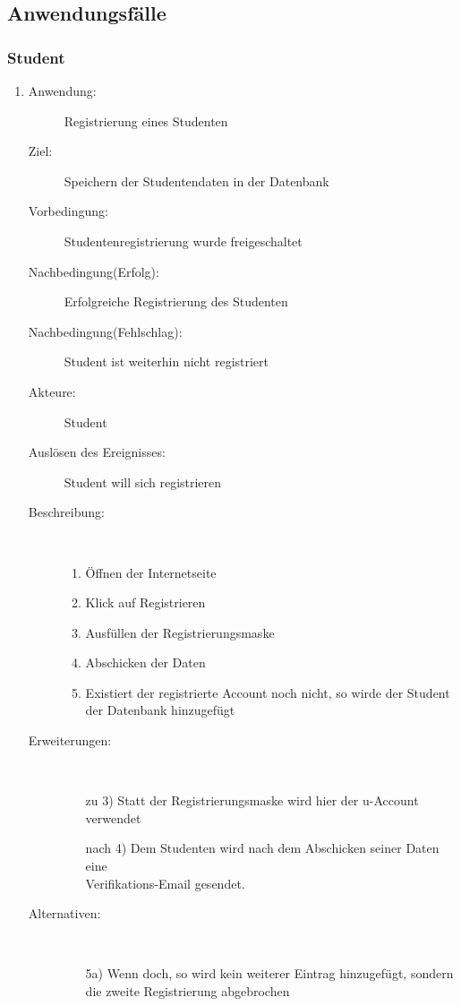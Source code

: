 \documentclass[parskip=full]{scrartcl}
\newcommand{\swtLabel}[1]{\textbf{\textbackslash #1\arabic*0\textbackslash}}
\begin{document}
\subsection{Anwendungsfälle}

\subsubsection{Student}

\begin{enumerate}[label=\swtLabel{S}]
	\item
    \begin{description}
  	\item[Anwendung:] Registrierung eines Studenten
  	\item[Ziel:] Speichern der Studentendaten in der Datenbank
  	\item[Vorbedingung:] Studentenregistrierung wurde freigeschaltet
  	\item[Nachbedingung(Erfolg):] Erfolgreiche Registrierung des Studenten
  	\item[Nachbedingung(Fehlschlag):] Student ist weiterhin nicht registriert
  	\item[Akteure:] Student
  	\item[Auslösen des Ereignisses:] Student will sich registrieren
  	\item[Beschreibung:]~
  	\begin{enumerate}
  	  \item Öffnen der Internetseite
      \item Klick auf Registrieren
      \item Ausfüllen der Registrierungsmaske
      \item Abschicken der Daten
      \item Existiert der registrierte Account noch nicht, so wirde der Student
      der Datenbank hinzugefügt
  	\end{enumerate}
  	\item[Erweiterungen:]~
  	\begin{enumerate}
  	  \item[zu 3)] Statt der Registrierungsmaske wird hier der u-Account
  	  verwendet
  	  \item[nach 4)] Dem Studenten wird nach dem Abschicken seiner Daten eine \\
  	  Verifikations-Email gesendet.
  	 \end{enumerate} 
  	\item[Alternativen:]~
  	\begin{enumerate}
  	  \item[5a)] Wenn doch, so wird kein weiterer Eintrag hinzugefügt, sondern
  	  die zweite Registrierung abgebrochen
  	\end{enumerate} 
  \end{description}
%   
  

\end{enumerate}
\end{document}
